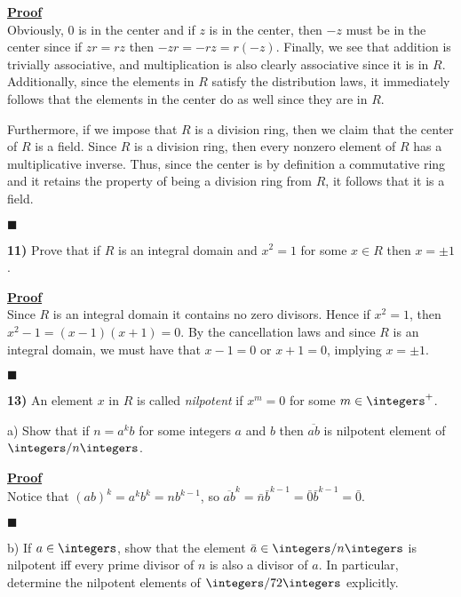 \documentclass[12pt,a4paper]{article}
\newcommand{\prob}[2]{\textbf{#1)} #2}
\newenvironment{proof}
{
\textbf{\underline{Proof}} \\
}
{
\begin{flushright}
$\blacksquare$
\end{flushright}}
\begin{document}
\begin{proof}
Obviously, $0$ is in the center and if $z$ is in the center, then $-z$ must be in the center since if $zr = rz$ then $-zr = -rz = r(-z)$. Finally, we see that addition is trivially associative, and multiplication is also clearly associative since it is in $R$. Additionally, since the elements in $R$ satisfy the distribution laws, it immediately follows that the elements in the center do as well since they are in $R$.

Furthermore, if we impose that $R$ is a division ring, then we claim that the center of $R$ is a field. Since $R$ is a division ring, then every nonzero element of $R$ has a multiplicative inverse. Thus, since the center is by definition a commutative ring and it retains the property of being a division ring from $R$, it follows that it is a field.
\end{proof}

\prob{11}{Prove that if $R$ is an integral domain and $x^2 = 1$ for some $x \in R$ then $x = \pm 1$.}

\begin{proof}
Since $R$ is an integral domain it contains no zero divisors. Hence if $x^2 = 1$, then $x^2 - 1 = (x-1)(x+1) = 0$. By the cancellation laws and since $R$ is an integral domain, we must have that $x-1 = 0$ or $x+1 = 0$, implying $x = \pm 1$.
\end{proof}

\prob{13}{An element $x$ in $R$ is called \textit{nilpotent} if $x^m = 0$ for some $m \in \integers^+$.}

a) Show that if $n = a^kb$ for some integers $a$ and $b$ then $\overline{ab}$ is nilpotent element of $\integers/n\integers$.

\begin{proof}
Notice that $(ab)^k = a^kb^k = nb^{k-1}$, so $\overline{ab}^k = \bar{n}\bar{b}^{k-1} = \bar{0}\bar{b}^{k-1} = \bar{0}$.
\end{proof}

b) If $a \in \integers$, show that the element $\bar{a} \in \integers/n\integers$ is nilpotent iff every prime divisor of $n$ is also a divisor of $a$. In particular, determine the nilpotent elements of $\integers/72\integers$ explicitly.
\end{document}
